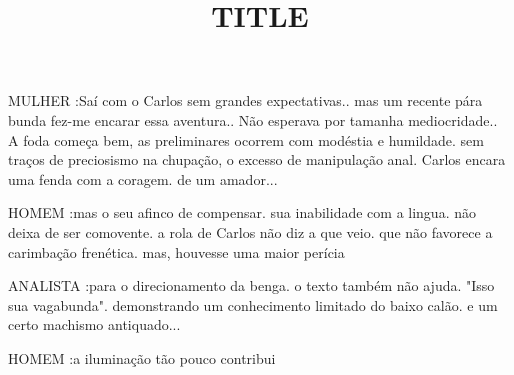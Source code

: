\documentclass[10pt]{article}
\author{}
\title{\vspace{-3.5cm}TITLE}
\date{}
\newcommand{\mychar}[1]{
  \bigskip
  \hspace{-2em} \MakeUppercase{#1}
}
\begin{document}
\maketitle



\mychar{MULHER}:Saí com o Carlos sem grandes expectativas.. mas um recente pára bunda fez-me encarar essa aventura.. Não esperava por tamanha mediocridade.. A foda começa bem, as preliminares ocorrem com modéstia e humildade. sem traços de preciosismo na chupação, o excesso de manipulação anal. Carlos encara uma fenda com a coragem. de um amador...

\mychar{HOMEM}:mas o seu afinco de compensar. sua inabilidade com a lingua. não deixa de ser comovente. a rola de Carlos não diz a que veio. que não favorece a carimbação frenética. mas, houvesse uma maior perícia

\mychar{ANALISTA}:para o direcionamento da benga. o texto também não ajuda. "Isso sua vagabunda". demonstrando um conhecimento limitado do baixo calão. e um certo machismo antiquado...

\mychar{HOMEM}:a iluminação tão pouco contribui
\end{document}
